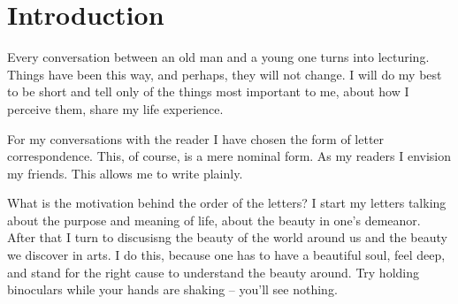 \chapter*{Introduction}

Every conversation between an old man and a young one turns into lecturing. Things have been this way, and perhaps, they will not change. I will do my best to be short and tell only of the things most important to me, about how I perceive them, share my life experience.\par

For my conversations with the reader I have chosen the form of letter correspondence. This, of course, is a mere nominal form. As my readers I envision my friends. This allows me to write plainly.\par

What is the motivation behind the order of the letters? I start my letters talking about the purpose and meaning of life, about the beauty in one's demeanor. After that I turn to discusisng the beauty of the world around us and the beauty we discover in arts. I do this, because one has to have a beautiful soul, feel deep, and stand for the right cause to understand the beauty around. Try holding binoculars while your hands are shaking -- you'll see nothing.